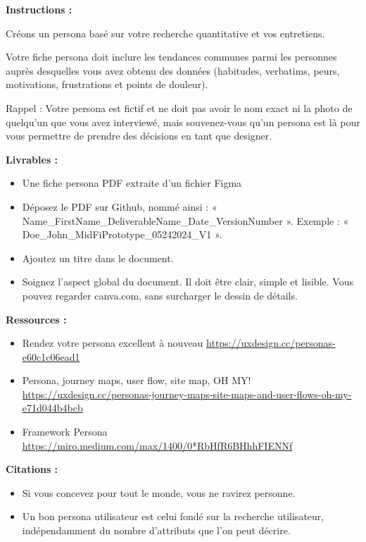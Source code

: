 \makeheaderfiles

\textbf{Instructions :}

Créons un persona basé sur votre recherche quantitative et vos entretiens.

Votre fiche persona doit inclure les tendances communes parmi les personnes auprès desquelles vous avez obtenu des données (habitudes, verbatims, peurs, motivations, frustrations et points de douleur).

Rappel : Votre persona est fictif et ne doit pas avoir le nom exact ni la photo de quelqu'un que vous avez interviewé, mais souvenez-vous qu'un persona est là pour vous permettre de prendre des décisions en tant que designer.

\textbf{Livrables :}

\begin{itemize}
\item Une fiche persona PDF extraite d'un fichier Figma
\item Déposez le PDF sur Github, nommé ainsi : « Name\_FirstName\_DeliverableName\_Date\_VersionNumber ». Exemple : « Doe\_John\_MidFiPrototype\_05242024\_V1 ».
\item Ajoutez un titre dans le document.
\item Soignez l'aspect global du document. Il doit être clair, simple et lisible. Vous pouvez regarder canva.com, sans surcharger le dessin de détails.
\end{itemize}

\textbf{Ressources :}

\begin{itemize}
\item Rendez votre persona excellent à nouveau \url{https://uxdesign.cc/personas-e60c1c06ead1}
\item Persona, journey maps, user flow, site map, OH MY! \url{https://uxdesign.cc/personas-journey-maps-site-maps-and-user-flows-oh-my-e71d044b4bcb}
\item Framework Persona \url{https://miro.medium.com/max/1400/0*RbHfR6BHhhFIENNf}
\end{itemize}

\textbf{Citations :}

\begin{itemize}
\item Si vous concevez pour tout le monde, vous ne ravirez personne.
\item Un bon persona utilisateur est celui fondé sur la recherche utilisateur, indépendamment du nombre d'attributs que l'on peut décrire.
\end{itemize}

